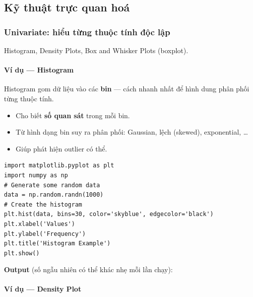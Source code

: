 \subsection{Kỹ thuật trực quan hoá}

\subsubsection{Univariate: hiểu từng thuộc tính độc lập}

\begin{phuongphap}[title={Ba kỹ thuật univariate trong Python}]
Histogram, Density Plots, Box and Whisker Plots (boxplot).
\end{phuongphap}

\paragraph{Ví dụ --- Histogram}

\begin{ynghia}[title={Histogram}]
Histogram gom dữ liệu vào các \textbf{bin} --- cách nhanh nhất để hình dung phân phối từng thuộc tính.
\end{ynghia}

\begin{tinhchat}[title={feature histogram}]
\begin{itemize}
  \item Cho biết \textbf{số quan sát} trong mỗi bin.
  \item Từ hình dạng bin suy ra phân phối: Gaussian, lệch (skewed), exponential, \ldots
  \item Giúp phát hiện outlier có thể.
\end{itemize}
\end{tinhchat}

\begin{vidu}[title={Code histogram (NumPy + Matplotlib)}]
\begin{lstlisting}
import matplotlib.pyplot as plt
import numpy as np
# Generate some random data
data = np.random.randn(1000)
# Create the histogram
plt.hist(data, bins=30, color='skyblue', edgecolor='black')
plt.xlabel('Values')
plt.ylabel('Frequency')
plt.title('Histogram Example')
plt.show()
\end{lstlisting}
\textbf{Output} (số ngẫu nhiên có thể khác nhẹ mỗi lần chạy):
\end{vidu}

\paragraph{Ví dụ --- Density Plot}

